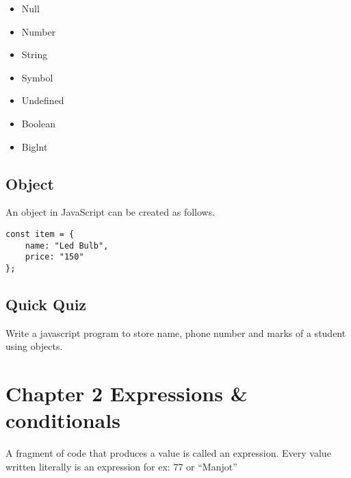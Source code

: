 \documentclass[11pt]{article}
\begin{document}
\begin{itemize}
\item Null
\item Number
\item String
\item Symbol
\item Undefined
\item Boolean
\item Biglnt
\end{itemize}
\subsection*{Object}
\label{sec:orgdcd6c8c}
An object in JavaScript can be created as follows.\\

\begin{verbatim}
const item = {
    name: "Led Bulb",
    price: "150"
};
\end{verbatim}
\subsection*{Quick Quiz}
\label{sec:orgdf37bd4}
Write a javascript program to store name, phone number and marks of a student using objects.

\newpage
\section*{Chapter 2 Expressions \& conditionals}
\label{sec:orgc2490d1}
A fragment of code that produces a value is called an expression. Every value written literally is an expression for ex: 77 or ``Manjot''
\end{document}
